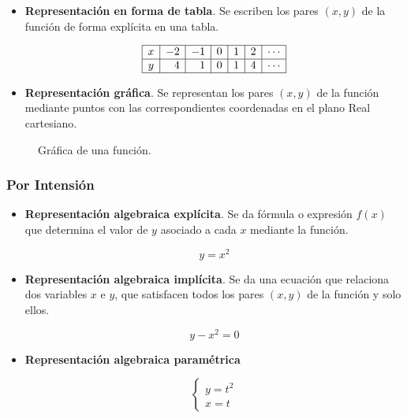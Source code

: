 \documentclass[
  a4paper,
]{scrreport}
\theoremstyle{plain}
\theoremstyle{plain}
\theoremstyle{definition}
\theoremstyle{definition}
\theoremstyle{plain}
\theoremstyle{remark}
\begin{document}
\begin{itemize}
\item
  \textbf{Representación en forma de tabla}. Se escriben los pares
  \((x,y)\) de la función de forma explícita en una tabla.

  \[
    \begin{array}{|c|r|r|r|r|r|r|}
    \hline
    x & -2 & -1 & 0 & 1 & 2 & \cdots \\
    \hline
    y & 4  & 1  & 0 & 1 & 4 & \cdots \\
    \hline
    \end{array}
    \]
\item
  \textbf{Representación gráfica}. Se representan los pares \((x,y)\) de
  la función mediante puntos con las correspondientes coordenadas en el
  plano Real cartesiano.
\end{itemize}

\begin{figure}

{\centering 



}

\caption{Gráfica de una función.}

\end{figure}

\hypertarget{por-intensiuxf3n}{%
\subsubsection*{Por Intensión}\label{por-intensiuxf3n}}

\begin{itemize}
\item
  \textbf{Representación algebraica explícita}. Se da fórmula o
  expresión \(f(x)\) que determina el valor de \(y\) asociado a cada
  \(x\) mediante la función.

  \[y=x^2\]
\item
  \textbf{Representación algebraica implícita}. Se da una ecuación que
  relaciona dos variables \(x\) e \(y\), que satisfacen todos los pares
  \((x,y)\) de la función y solo ellos.

  \[y-x^2=0\]
\item
  \textbf{Representación algebraica paramétrica}

  \[\begin{cases}
    y=t^2\\
    x=t
    \end{cases}
    \]
\end{itemize}
\end{document}
